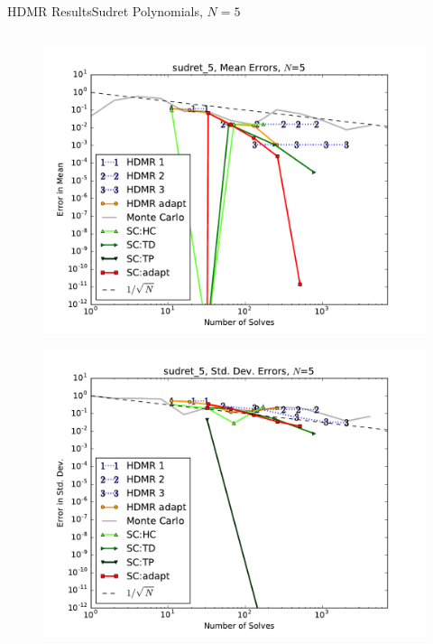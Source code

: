 \documentclass{beamer}
\begin{document}
\begin{frame}{HDMR Results}{Sudret Polynomials, $N=5$}
\begin{columns}
\begin{column}{0.5\textwidth}
\begin{figure}[h!]
          \includegraphics[width=0.8\linewidth]{anlmodels/sudret_5_mean_errs}
        \end{figure}
        \vspace{-20pt}
        \begin{figure}[h!]
          \centering
          \includegraphics[width=0.8\linewidth]{anlmodels/sudret_5_variance_errs}
        \end{figure}
   \end{column}
 \end{columns}
\end{frame}
\end{document}
